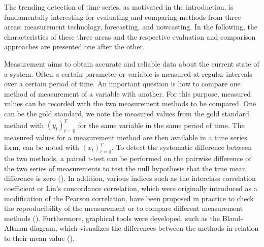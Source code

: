 
The trending detection of time series, as motivated in the introduction, is fundamentally interesting for evaluating and comparing methods from three areas: measurement technology, forecasting, and nowcasting. In the following, the characteristics of these three areas and the respective evaluation and comparison approaches are presented one after the other.

Measurement aims to obtain accurate and reliable data about the current state of a system. Often a certain parameter or variable is measured at regular intervals over a certain period of time.
An important question is how to compare one method of measurement of a variable with another.
For this purpose, measured values can be recorded with the two measurement methods to be compared. One can be the gold standard, we note the measured values from the gold standard method with $(y_t)^T_{t=0}$ for the same variable in the same period of time. 
The measured values for a measurement method are then available in a time series form, can be noted with $(x_t)^T_{t=0}$. 
To detect the systematic difference between the two methods, a paired t-test can be performed on the pairwise difference of the two series of measurements to test the null hypothesis that the true mean difference is zero (\cite{watson2010method}).
In addition, various indices such as the interclass correlation coefficient or Lin's concordance correlation, which were originally introduced as a modification of the Pearson correlation, have been proposed in practice to check the reproducibility of the measurement or to compare different measurement methods (\cite{lawrence1989concordance,koo2016guideline,}). 
Furthermore, graphical tools were developed, such as the Bland-Altman diagram, which visualizes the differences between the methods in relation to their mean value (\cite{bland1986statistical}).


